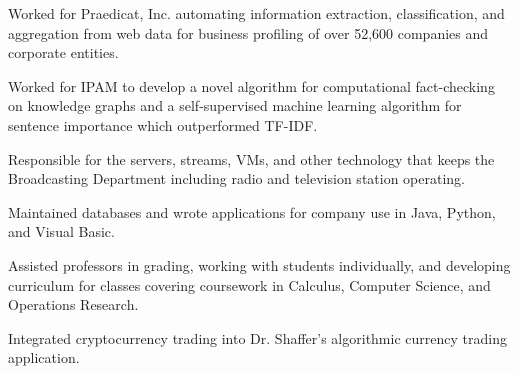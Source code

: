\documentclass{acmresume}
\begin{document}
        \begin{titemize}
            \item{Worked for Praedicat, Inc. automating information extraction, classification, and aggregation from web data for business profiling of over 52,600 companies and corporate entities.}
            \item{Worked for IPAM to develop a novel algorithm for computational fact-checking on knowledge graphs and a self-supervised machine learning algorithm for sentence importance which outperformed TF-IDF.}
        \end{titemize}
    
        \begin{titemize}
            \item{Responsible for the servers, streams, VMs, and other technology that keeps the Broadcasting Department including radio and television station operating.}
        \end{titemize}
        
        \begin{titemize}
            \item{Maintained databases and wrote applications for company use in Java, Python, and Visual Basic.}
        \end{titemize}
		
        \begin{titemize}
            \item Assisted professors in grading, working with students individually, and developing curriculum for classes covering coursework in Calculus, Computer Science, and Operations Research.
        \end{titemize}

        \begin{titemize}
            \item Integrated cryptocurrency trading into Dr. Shaffer's algorithmic currency trading application.
        \end{titemize}
\end{document}
